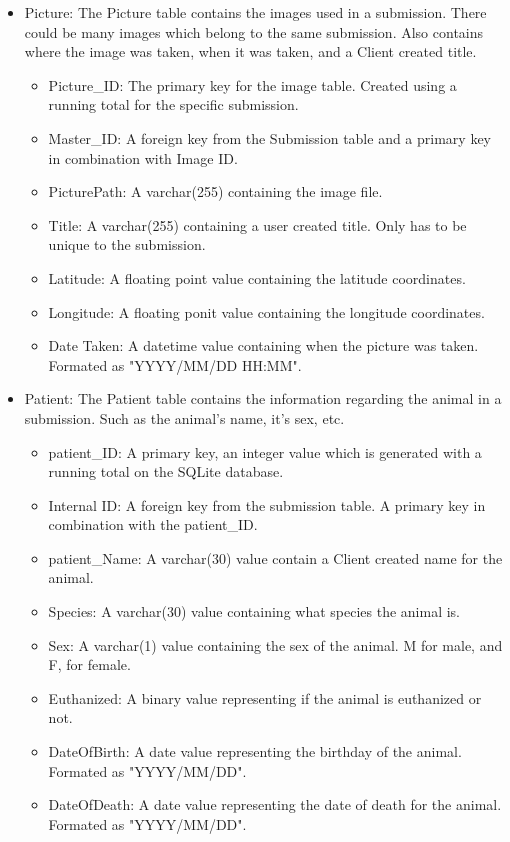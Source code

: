 \documentclass[onecolumn, draftclsnofoot,10pt, compsoc]{IEEEtran}
\begin{document}
\begin{itemize}
\item Picture:\newline
The Picture table contains the images used in a submission. There could be many images which belong to the same submission. Also contains where the image was taken, when it was taken, and a Client created title.
\begin{itemize}
\item Picture\_ID: The primary key for the image table. Created using a running total for the specific submission.
\item Master\_ID: A foreign key from the Submission table and a primary key in combination with Image ID.
\item PicturePath: A varchar(255) containing the image file.
\item Title: A varchar(255) containing a user created title. Only has to be unique to the submission. 
\item Latitude: A floating point value containing the latitude coordinates.
\item Longitude: A floating ponit value containing the longitude coordinates.
\item Date Taken: A datetime value containing when the picture was taken. Formated as "YYYY/MM/DD HH:MM".
\end{itemize}

\item Patient:\newline
The Patient table contains the information regarding the animal in a submission. Such as the animal's name, it's sex, etc.
\begin{itemize}
\item patient\_ID: A primary key, an integer value which is generated with a running total on the SQLite database.
\item Internal ID: A foreign key from the submission table. A primary key in combination with the patient\_ID.
\item patient\_Name: A varchar(30) value contain a Client created name for the animal.
\item Species: A varchar(30) value containing what species the animal is.
\item Sex: A varchar(1) value containing the sex of the animal. M for male, and F, for female.
\item Euthanized: A binary value representing if the animal is euthanized or not.
\item DateOfBirth: A date value representing the birthday of the animal. Formated as "YYYY/MM/DD".
\item DateOfDeath: A date value representing the date of death for the animal. Formated as "YYYY/MM/DD".
\end{itemize}


\end{itemize}
\end{document}
